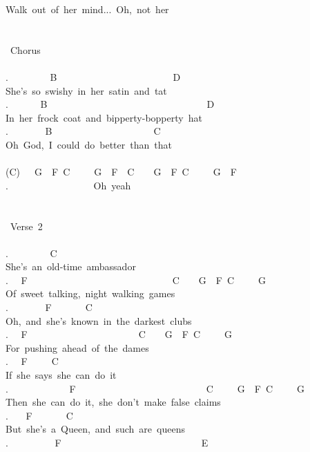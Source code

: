 {Walk\ out\ of\ her\ mind...\ Oh,\ not\ her\\
\\
\\
\lbrack\ Chorus\rbrack\\
\\
. \ \ \ \ \ \ \ \ B\ \ \ \ \ \ \ \ \ \ \ \ \ \ \ \ \ \ \ \ \ \ \ \ D\\
She's\ so\ swishy\ in\ her\ satin\ and\ tat\\
. \ \ \ \ \ \ B\ \ \ \ \ \ \ \ \ \ \ \ \ \ \ \ \ \ \ \ \ \ \ \ \ \ \ \ \ \ \ \ \ D\\
In\ her\ frock\ coat\ and\ bipperty-bopperty\ hat\\
. \ \ \ \ \ \ \ B\ \ \ \ \ \ \ \ \ \ \ \ \ \ \ \ \ \ \ \ \ C\\
Oh\ God,\ I\ could\ do\ better\ than\ that\\
\\
(C)\ \ \ G\ \ F\ C\ \ \ \ \ G\ \ F\ \ C\ \ \ \ G\ \ F\ C\ \ \ \ \ G\ \ F\\
. \ \ \ \ \ \ \ \ \ \ \ \ \ \ \ \ \ Oh\ yeah\\
\\
\\
\lbrack\ Verse\ 2\rbrack\\
\\
. \ \ \ \ \ \ \ \ C\\
She's\ an\ old-time\ ambassador\\
. \ \ F\ \ \ \ \ \ \ \ \ \ \ \ \ \ \ \ \ \ \ \ \ \ \ \ \ \ \ \ \ \ C\ \ \ \ G\ \ F\ C\ \ \ \ \ G\\
Of\ sweet\ talking,\ night\ walking\ games\\
. \ \ \ \ \ \ \ F\ \ \ \ \ \ \ C\\
Oh,\ and\ she's\ known\ in\ the\ darkest\ clubs\\
. \ \ F\ \ \ \ \ \ \ \ \ \ \ \ \ \ \ \ \ \ \ \ \ \ \ C\ \ \ \ G\ \ F\ C\ \ \ \ \ G\\
For\ pushing\ ahead\ of\ the\ dames\\
. \ \ F\ \ \ \ \ C\\
If\ she\ says\ she\ can\ do\ it\\
. \ \ \ \ \ \ \ \ \ \ \ \ F\ \ \ \ \ \ \ \ \ \ \ \ \ \ \ \ \ \ \ \ \ \ \ \ \ \ \ C\ \ \ \ \ G\ \ F\ C\ \ \ \ \ G\\
Then\ she\ can\ do\ it,\ she\ don't\ make\ false\ claims\\
. \ \ \ F\ \ \ \ \ \ \ C\\
But\ she's\ a\ Queen,\ and\ such\ are\ queens\\
. \ \ \ \ \ \ \ \ \ F\ \ \ \ \ \ \ \ \ \ \ \ \ \ \ \ \ \ \ \ \ \ \ \ \ \ \ \ \ E\\
}
